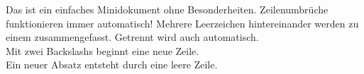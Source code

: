 \documentclass[a4paper, pdftex, 12pt, ngerman]{article}
\begin{document}
Das ist ein einfaches Minidokument
ohne Besonderheiten. Zeilenumbrüche
funktionieren immer automatisch!
Mehrere
Leerzeichen hintereinander werden 
zu      einem zusammengefasst.
Getrennt wird auch automatisch.\\
Mit zwei Backslashs beginnt eine neue
Zeile.\\
Ein neuer Absatz entsteht durch eine
leere Zeile.
\end{document}
